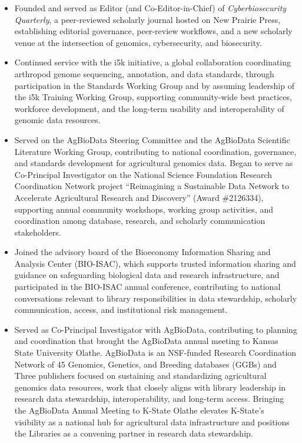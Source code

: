 \begin{itemize}
  \item Founded and served as Editor (and Co-Editor-in-Chief) of \textit{Cyberbiosecurity Quarterly}, a peer-reviewed scholarly journal hosted on New Prairie Press, establishing editorial governance, peer-review workflows, and a new scholarly venue at the intersection of genomics, cybersecurity, and biosecurity.

  \item Continued service with the i5k initiative, a global collaboration coordinating arthropod genome sequencing, annotation, and data standards, through participation in the Standards Working Group and by assuming leadership of the i5k Training Working Group, supporting community-wide best practices, workforce development, and the long-term usability and interoperability of genomic data resources.

  \item Served on the AgBioData Steering Committee and the AgBioData Scientific Literature Working Group, contributing to national coordination, governance, and standards development for agricultural genomics data. Began to serve as Co-Principal Investigator on the National Science Foundation Research Coordination Network project “Reimagining a Sustainable Data Network to Accelerate Agricultural Research and Discovery” (Award \#2126334), supporting annual community workshops, working group activities, and coordination among database, research, and scholarly communication stakeholders.

  \item Joined the advisory board of the Bioeconomy Information Sharing and Analysis Center (BIO-ISAC), which supports trusted information sharing and guidance on safeguarding biological data and research infrastructure, and participated in the BIO-ISAC annual conference, contributing to national conversations relevant to library responsibilities in data stewardship, scholarly communication, access, and institutional risk management.

  \item Served as Co-Principal Investigator with AgBioData, contributing to planning and coordination that brought the AgBioData annual meeting to Kansas State University Olathe. AgBioData is an NSF-funded Research Coordination Network of 45 Genomics, Genetics, and Breeding databases (GGBs) and Three publishers focused on sustaining and standardizing agricultural genomics data resources, work that closely aligns with library leadership in research data stewardship, interoperability, and long-term access. Bringing the AgBioData Annual Meeting to K-State Olathe elevates K-State’s visibility as a national hub for agricultural data infrastructure and positions the Libraries as a convening partner in research data stewardship.
\end{itemize}


